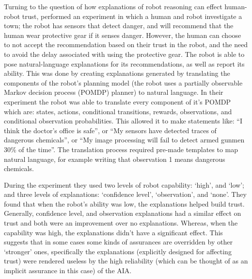 Turning to the question of how explanations of robot reasoning can effect human-robot trust, \citet{Wang2016-id} performed an experiment in which a human and robot investigate a town; the robot has sensors that detect danger, and will recommend that the human wear protective gear if it senses danger. However, the human can choose to not accept the recommendation based on their trust in the robot, and the need to avoid the delay associated with using the protective gear. The robot is able to pose natural-language explanations for its recommendations, as well as report its ability. This was done by creating explanations generated by translating the components of the robot's planning model (the robot uses a partially observable Markov decision process (POMDP) planner) to natural language. In their experiment the robot was able to translate every component of it's POMDP which are: states, actions, conditional transitions, rewards, observations, and conditional observation probabilities. This allowed it to make statements like: ``I think the doctor's office is safe'', or ``My sensors have detected traces of dangerous chemicals'', or ``My image processing will fail to detect armed gunmen 30\% of the time''. The translation process required pre-made templates to map natural language, for example writing that observation 1 means dangerous chemicals.

During the experiment they used two levels of robot capability: `high', and `low'; and three levels of explanations: `confidence level', `observation', and `none'. They found that when the robot's ability was low, the explanations helped build trust. Generally, confidence level, and observation explanations had a similar effect on trust and both were an improvement over no explanations. Whereas, when the capability was high, the explanations didn't have a significant effect. This suggests that in some cases some kinds of assurances are overridden by other `stronger' ones, specifically the explanations (explicitly designed for affecting trust) were rendered useless by the high reliability (which can be thought of as an implicit assurance in this case) of the AIA.

